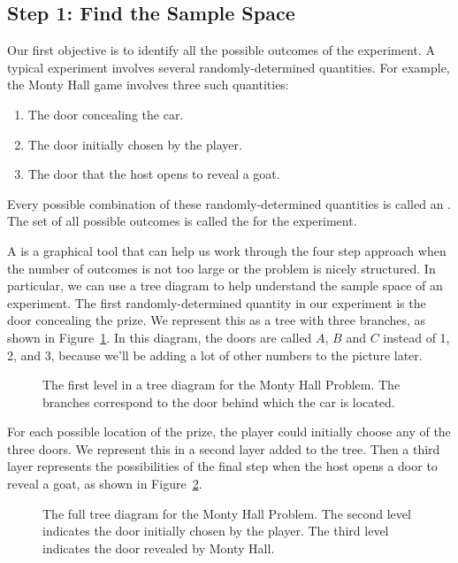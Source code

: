 \subsection{Step 1:  Find the Sample Space}

Our first objective is to identify all the possible outcomes of the
experiment.  A typical experiment involves several randomly-determined
quantities.  For example, the Monty Hall game involves three such
quantities:
%
\begin{enumerate}
\item The door concealing the car.
\item The door initially chosen by the player.
\item The door that the host opens to reveal a goat.
\end{enumerate}
%
Every possible combination of these randomly-determined quantities is
called an .  The set of all possible outcomes is called
the  for the experiment.

A  is a graphical tool that can help us work
through the four step approach when the number of outcomes is not too
large or the problem is nicely structured.  In particular, we can use
a tree diagram to help understand the sample space of an experiment.
The first randomly-determined quantity in our experiment is the door
concealing the prize.  We represent this as a tree with three
branches, as shown in Figure~\ref{fig:14A1}.  In this diagram, the
doors are called $A$, $B$ and $C$ instead of 1, 2, and 3, because
we'll be adding a lot of other numbers to the picture later.

\begin{figure}


\caption{The first level in a tree diagram for the Monty Hall
  Problem.  The branches correspond to the door behind which the car
  is located.}

\label{fig:14A1}

\end{figure}

For each possible location of the prize, the player could initially
choose any of the three doors.  We represent this in a second layer
added to the tree.  Then a third layer represents the possibilities of
the final step when the host opens a door to reveal a goat, as shown
in Figure~\ref{fig:14A2}.

\begin{figure}


\caption{The full tree diagram for the Monty Hall Problem.  The second
level indicates the door initially chosen by the player.  The third
level indicates the door revealed by Monty Hall.}

\label{fig:14A2}

\end{figure}

